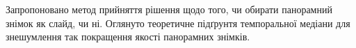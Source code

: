 \chapterConclusion

Запропоновано метод прийняття рішення щодо того, чи обирати панорамний знімок як слайд, чи ні.
Оглянуто теоретичне підґрунтя темпоральної медіани для 
знешумлення так покращення якості панорамних знімків.
